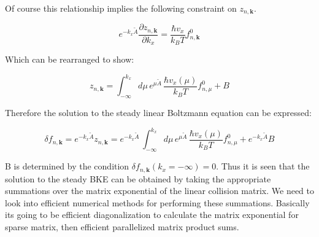 \documentclass[preprint,12pt]{elsarticle}
\begin{document}
\noindent Of course this relationship implies the following constraint on $z_{n,\mathbf{k}}$.

\begin{equation}
    e^{-k_x \tilde{A}} \frac{\partial z_{n,\mathbf{k}}}{\partial k_x} = \frac{\hbar v_x}{k_B T} f_{n,\mathbf{k}}^0
\end{equation}

\noindent Which can be rearranged to show:

\begin{equation}
    z_{n,\mathbf{k}} = \int_{-\infty}^{k_x} d\mu \, e^{\mu \tilde{A}} \, \frac{\hbar v_x(\mu)}{k_B T} f_{n,\mu}^0 + B
\end{equation}

\noindent Therefore the solution to the steady linear Boltzmann equation can be expressed:

\begin{equation}
    \delta f_{n,\mathbf{k}} = e^{-k_x \tilde{A}} z_{n,\mathbf{k}} = e^{-k_x \tilde{A}} \,  \int_{-\infty}^{k_x} d\mu \, e^{\mu \tilde{A}} \, \frac{\hbar v_x(\mu)}{k_B T} f_{n,\mu}^0 + e^{-k_x \tilde{A}} B
\end{equation}

\noindent B is determined by the condition $\delta f_{n,\mathbf{k}}(k_x = -\infty) = 0$. Thus it is seen that the solution to the steady BKE can be obtained by taking the appropriate summations over the matrix exponential of the linear collision matrix. We need to look into efficient numerical methods for performing these summations. Basically its going to be efficient diagonalization to calculate the matrix exponential for sparse matrix, then efficient parallelized matrix product sums.
\end{document}
